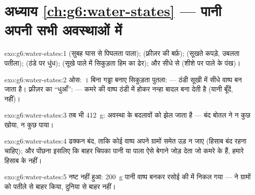 \section*{अध्याय \ref{ch:g6:water-states} --- पानी अपनी सभी अवस्थाओं में}

\begin{solution}{exo:g6:water-states:1}
 (सुबह घास से पिघलता पाला);  (फ़्रीज़र की बर्फ़); 
(सूखते कपड़े, उबलता पतीला);  (ठंडे  पर धुंध); 
(सूखे पाले में सिकुड़ता हिम का ढेर); और सीधे  से  (शीशे पर पाले
के पंख)।
\end{solution}

\begin{solution}{exo:g6:water-states:2}
ओस: । बिना गड्ढा बनाए सिकुड़ता पुतला:  --- ठंडी सूखी
 में  सीधे वाष्प बन जाता है। फ़्रीज़र का ``धुआँ'':  ---
कमरे की वाष्प ठंडी  में  होकर नन्हा बादल बना देती है (यानी
बूँदें,  नहीं)।
\end{solution}

\begin{solution}{exo:g6:water-states:3}
तब भी \qty{412}{g}:  अवस्था के बदलावों को झेल जाता है ---
बंद बोतल ने न कुछ खोया, न कुछ पाया।
\end{solution}

\begin{solution}{exo:g6:water-states:4}
ढक्कन बंद, ताकि कोई वाष्प अपने ग्रामों समेत उड़ न जाए (हिसाब बंद रहना
चाहिए); और पोंछना इसलिए कि बाहर चिपका पानी या पाला ऐसे बेगाने 
जोड़ देता जो कमरे के हैं, हमारे हिसाब के नहीं।
\end{solution}

\begin{solution}{exo:g6:water-states:5}
नष्ट नहीं हुआ: \qty{200}{g} पानी वाष्प बनकर रसोई की  में निकल गया
---  ने ग्रामों को पतीले से बाहर किया, दुनिया से बाहर नहीं।
\end{solution}

